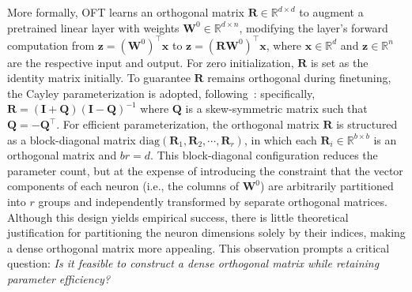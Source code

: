 More formally, OFT learns an orthogonal matrix $\bm{R}\in\mathbb{R}^{d\times d}$ to augment a pretrained linear layer with weights $\bm{W}^0\in\mathbb{R}^{d\times n}$, modifying the layer’s forward computation from $\bm{z}=(\bm{W}^0)^\top\bm{x}$ to $\bm{z}=(\bm{R}\bm{W}^0)^\top\bm{x}$, where $\bm{x}\in\mathbb{R}^{d}$ and $\bm{z}\in\mathbb{R}^{n}$ are the respective input and output. For zero initialization, $\bm{R}$ is set as the identity matrix initially. To guarantee $\bm{R}$ remains orthogonal during finetuning, the Cayley parameterization is adopted, following~\cite{qiu2023controlling,liu2021orthogonal}: specifically, $\bm{R}=(\bm{I}+\bm{Q})(\bm{I}-\bm{Q})^{-1}$ where $\bm{Q}$ is a skew-symmetric matrix such that $\bm{Q}=-\bm{Q}^\top$. For efficient parameterization, the orthogonal matrix $\bm{R}$ is structured as a block-diagonal matrix $\text{diag}(\bm{R}_1, \bm{R}_2, \cdots, \bm{R}_r)$, in which each $\bm{R}_i\in\mathbb{R}^{b\times b}$ is an orthogonal matrix and $br=d$. This block-diagonal configuration reduces the parameter count, but at the expense of introducing the constraint that the vector components of each neuron (i.e., the columns of $\bm{W}^0$) are arbitrarily partitioned into $r$ groups and independently transformed by separate orthogonal matrices. Although this design yields empirical success, there is little theoretical justification for partitioning the neuron dimensions solely by their indices, making a dense orthogonal matrix more appealing. This observation prompts a critical question: \emph{Is it feasible to construct a dense orthogonal matrix while retaining parameter efficiency?}

